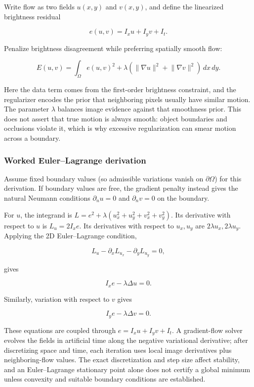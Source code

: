 Write flow as two fields \(u(x,y)\) and \(v(x,y)\), and define the linearized brightness residual

\[
e(u,v)=I_xu+I_yv+I_t.
\]

Penalize brightness disagreement while preferring spatially smooth flow:

\[
E(u,v)=\int_\Omega e(u,v)^2+\lambda\left(\lVert\nabla u\rVert^2+\lVert\nabla v\rVert^2\right)\,dx\,dy.
\]

Here the data term comes from the first-order brightness constraint, and the regularizer encodes the prior that neighboring pixels usually have similar motion. The parameter \(\lambda\) balances image evidence against that smoothness prior. This does not assert that true motion is always smooth: object boundaries and occlusions violate it, which is why excessive regularization can smear motion across a boundary.

\subsubsection{Worked Euler--Lagrange derivation}\label{02-foundations-ii-ch036-worked-eulerlagrange-derivation}

\hypertarget{02-foundations-ii-ch036-worked-eulerlagrange-derivation}{}

Assume fixed boundary values (so admissible variations vanish on \(\partial\Omega\)) for this derivation. If boundary values are free, the gradient penalty instead gives the natural Neumann conditions \(\partial_n u=0\) and \(\partial_n v=0\) on the boundary.

For \(u\), the integrand is \(L=e^2+\lambda(u_x^2+u_y^2+v_x^2+v_y^2)\). Its derivative with respect to \(u\) is \(L_u=2I_x e\). Its derivatives with respect to \(u_x,u_y\) are \(2\lambda u_x,2\lambda u_y\). Applying the 2D Euler--Lagrange condition,

\[
L_u-\partial_x L_{u_x}-\partial_y L_{u_y}=0,
\]

gives

\[
I_x e-\lambda\Delta u=0.
\]

Similarly, variation with respect to \(v\) gives

\[
I_y e-\lambda\Delta v=0.
\]

These equations are coupled through \(e=I_xu+I_yv+I_t\). A gradient-flow solver evolves the fields in artificial time along the negative variational derivative; after discretizing space and time, each iteration uses local image derivatives plus neighboring-flow values. The exact discretization and step size affect stability, and an Euler--Lagrange stationary point alone does not certify a global minimum unless convexity and suitable boundary conditions are established.

